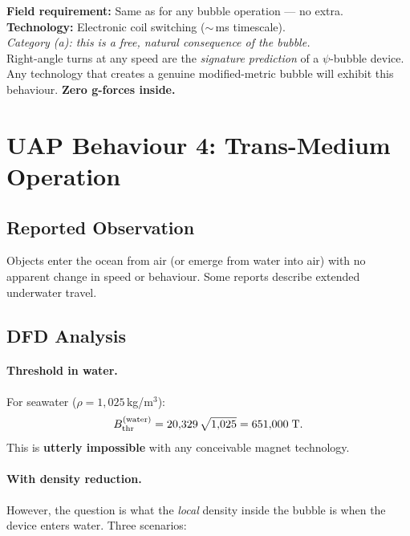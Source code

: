 \documentclass[12pt,a4paper]{article}
\begin{document}
\begin{tcolorbox}[colback=green!5!white, colframe=green!60!black,
  title=Right-Angle Turn Assessment]
\textbf{Field requirement:} Same as for any bubble operation --- no extra.\\
\textbf{Technology:} Electronic coil switching ($\sim$\,ms timescale).\\
\emph{Category (a): this is a free, natural consequence of the bubble.}\\[4pt]
Right-angle turns at any speed are the \emph{signature prediction} of
a $\psi$-bubble device.  Any technology that creates a genuine modified-metric
bubble will exhibit this behaviour.  \textbf{Zero g-forces inside.}
\end{tcolorbox}


\section{UAP Behaviour 4: Trans-Medium Operation}\label{sec:transmedium}

\subsection{Reported Observation}

Objects enter the ocean from air (or emerge from water into air) with
no apparent change in speed or behaviour.  Some reports describe
extended underwater travel.

\subsection{DFD Analysis}

\paragraph{Threshold in water.}
For seawater ($\rho = 1{,}025$\,kg/m$^3$):
\begin{equation}
B_{\rm thr}^{\rm (water)} = 20{,}329\,\sqrt{1{,}025} = 651{,}000\;\text{T.}
\end{equation}
This is \textbf{utterly impossible} with any conceivable magnet technology.

\paragraph{With density reduction.}
However, the question is what the \emph{local} density inside the bubble is
when the device enters water.  Three scenarios:
\end{document}
